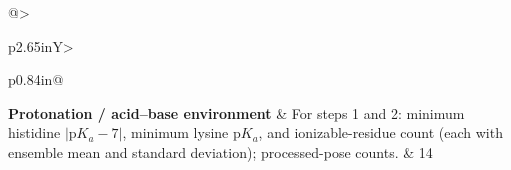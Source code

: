 \documentclass[11pt]{article}
\begin{document}
\begin{tabularx}{\textwidth}{@{}>{\raggedright\arraybackslash{}}p{2.65in}Y>{\raggedright\arraybackslash}p{0.84in}@{}}
\textbf{Protonation / acid--base environment} & For steps 1 and 2: minimum histidine $|\mathrm{p}K_a-7|$, minimum lysine p$K_a$, and ionizable-residue count (each with ensemble mean and standard deviation); processed-pose counts. & 14 \\

\end{tabularx}
\end{document}
